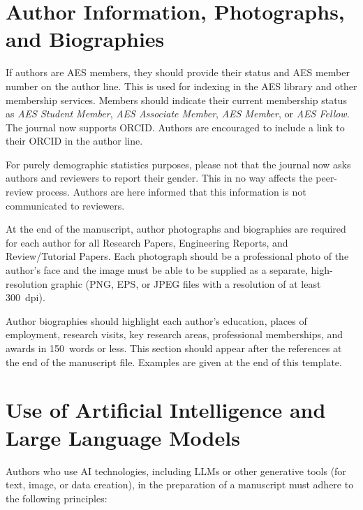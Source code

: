\documentclass[fleqn]{jaes}
\begin{document}
\section{Author Information, Photographs, and Biographies}\label{sec:authophoto}
If authors are AES members, they should provide their status and AES member number on the author line. This is used for indexing in the AES library and other membership services. Members should indicate their current membership status as \emph{AES Student Member}, \emph{AES Associate Member}, \emph{AES Member}, or \emph{AES Fellow}.
The journal now supports ORCID. Authors are encouraged to include a link to their ORCID in the author line. 

For purely demographic statistics purposes, please not that the journal now asks authors and reviewers to report their gender. This in no way affects the peer-review process. Authors are here informed that this information is not communicated to reviewers. 

At the end of the manuscript, author photographs and biographies are required for each author for all Research Papers, Engineering Reports, and Review/Tutorial Papers. Each photograph should be a professional photo of the author’s face and the image must be able to be supplied as a separate, high-resolution graphic (PNG, EPS, or JPEG files with a resolution of at least 300~dpi). 

Author biographies should highlight each author’s education, places of employment, research visits, key research areas, professional memberships, and awards in 150~words or less. This section should appear after the references at the end of the manuscript file. Examples are given at the end of this template.

\section{Use of Artificial Intelligence and Large Language Models}\label{sec:AI-LLM} 

Authors who use AI technologies, including LLMs or other generative tools (for text, image, or data creation), in the preparation of a manuscript must adhere to the following principles:
\end{document}
